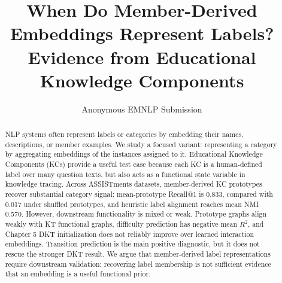 \documentclass[11pt]{article}
\title{When Do Member-Derived Embeddings Represent Labels? Evidence from Educational Knowledge Components}
\author{Anonymous EMNLP Submission}
\begin{document}
\maketitle
\begin{abstract}
NLP systems often represent labels or categories by embedding their names, descriptions, or member examples. We study a focused variant: representing a category by aggregating embeddings of the instances assigned to it. Educational Knowledge Components (KCs) provide a useful test case because each KC is a human-defined label over many question texts, but also acts as a functional state variable in knowledge tracing. Across ASSISTments datasets, member-derived KC prototypes recover substantial category signal: mean-prototype Recall@1 is 0.833, compared with 0.017 under shuffled prototypes, and heuristic label alignment reaches mean NMI 0.570. However, downstream functionality is mixed or weak. Prototype graphs align weakly with KT functional graphs, difficulty prediction has negative mean $R^2$, and Chapter 5 DKT initialization does not reliably improve over learned interaction embeddings. Transition prediction is the main positive diagnostic, but it does not rescue the stronger DKT result. We argue that member-derived label representations require downstream validation: recovering label membership is not sufficient evidence that an embedding is a useful functional prior.
\end{abstract}











\end{document}
